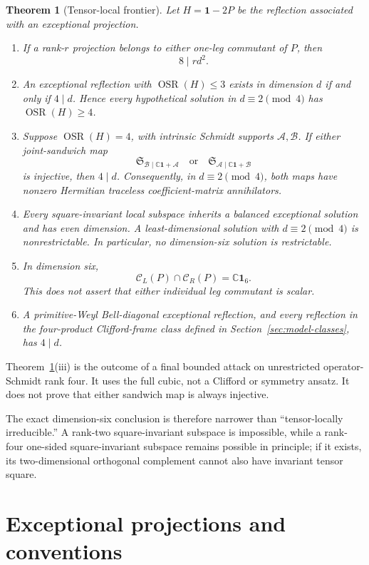 \documentclass[11pt]{article}
\newtheorem{theorem}{Theorem}[section]
\theoremstyle{definition}
\theoremstyle{remark}
\newcommand{\Id}{\mathbf 1}
\newcommand{\OSR}{\operatorname{OSR}}
\newcommand{\bbC}{\mathbb C}
\newcommand{\cA}{\mathcal A}
\newcommand{\cB}{\mathcal B}
\newcommand{\cC}{\mathcal C}
\newcommand{\cS}{\mathfrak S}
\begin{document}
\begin{theorem}[Tensor-local frontier]\label{thm:frontier-summary}
Let \(H=\Id-2P\) be the reflection associated with an exceptional
projection.
\begin{enumerate}[label=\textup{(\roman*)}]
\item If a rank-\(r\) projection belongs to either one-leg commutant of
\(P\), then
\[
  8\mid rd^2.
\]
\item An exceptional reflection with \(\OSR(H)\le3\) exists in dimension
\(d\) if and only if \(4\mid d\). Hence every hypothetical solution in
\(d\equiv2\pmod4\) has \(\OSR(H)\ge4\).
\item Suppose \(\OSR(H)=4\), with intrinsic Schmidt supports
\(\cA,\cB\). If either joint-sandwich map
\[
  \cS_{\cB\mid\bbC\Id+\cA}
  \quad\text{or}\quad
  \cS_{\cA\mid\bbC\Id+\cB}
\]
is injective, then \(4\mid d\). Consequently, in
\(d\equiv2\pmod4\), both maps have nonzero Hermitian traceless
coefficient-matrix annihilators.
\item Every square-invariant local subspace inherits a balanced
exceptional solution and has even dimension. A least-dimensional solution
with \(d\equiv2\pmod4\) is nonrestrictable. In particular, no
dimension-six solution is restrictable.
\item In dimension six,
\[
  \cC_L(P)\cap\cC_R(P)=\bbC\Id_6.
\]
This does not assert that either individual leg commutant is scalar.
\item A primitive-Weyl Bell-diagonal exceptional reflection, and every
reflection in the four-product Clifford-frame class defined in
Section~\ref{sec:model-classes}, has \(4\mid d\).
\end{enumerate}
\end{theorem}

Theorem~\ref{thm:frontier-summary}(iii) is the outcome of a final bounded
attack on unrestricted operator-Schmidt rank four. It uses the full cubic,
not a Clifford or symmetry ansatz. It does not prove that either sandwich
map is always injective.

The exact dimension-six conclusion is therefore narrower than
``tensor-locally irreducible.'' A rank-two square-invariant subspace is
impossible, while a rank-four one-sided square-invariant subspace remains
possible in principle; if it exists, its two-dimensional orthogonal
complement cannot also have invariant tensor square.

\section{Exceptional projections and conventions}\label{sec:setup}
\end{document}
